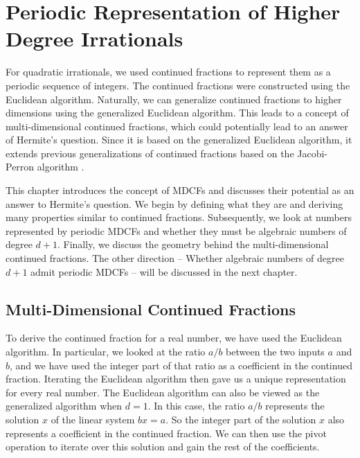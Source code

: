 \chapter{Periodic Representation of Higher Degree Irrationals}
\label{ch:mdcf}

For quadratic irrationals, we used continued fractions to represent them as a
periodic sequence of integers.
The continued fractions were constructed using the Euclidean algorithm.
Naturally, we can generalize continued fractions to higher dimensions using the
generalized Euclidean algorithm.
This leads to a concept of multi-dimensional continued fractions, which could
potentially lead to an answer of Hermite's question.
Since it is based on the generalized Euclidean algorithm,
it extends previous generalizations of continued fractions based on the
Jacobi-Perron algorithm \cite{Gupta00}.

This chapter introduces the concept of MDCFs and discusses their potential as
an answer to Hermite's question.
We begin by defining what they are and deriving many properties similar to
continued fractions.
Subsequently, we look at numbers represented by periodic MDCFs and whether they
must be algebraic numbers of degree $d+1$.
Finally, we discuss the geometry behind the multi-dimensional continued fractions.
The other direction -- Whether algebraic numbers of degree $d+1$ admit periodic
MDCFs -- will be discussed in the next chapter.

\section{Multi-Dimensional Continued Fractions}

To derive the continued fraction for a real number, we have used the Euclidean algorithm.
In particular, we looked at the ratio $a/b$ between the two inputs $a$ and $b$,
and we have used the integer part of that ratio as a coefficient in the
continued fraction.
Iterating the Euclidean algorithm then gave us a unique representation for
every real number.
The Euclidean algorithm can also be viewed as the generalized algorithm when $d = 1$.
In this case, the ratio $a/b$ represents the solution $x$ of the linear system $bx = a$.
So the integer part of the solution $x$ also represents a coefficient in the
continued fraction.
We can then use the pivot operation to iterate over this solution and gain the
rest of the coefficients.

